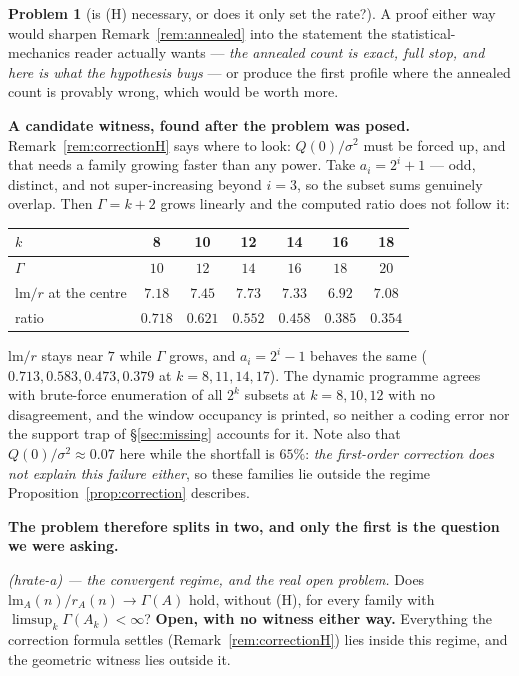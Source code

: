 \documentclass[11pt,a4paper]{article}
\theoremstyle{plain}
\theoremstyle{definition}
\newtheorem{problem}[theorem]{Problem}
\theoremstyle{remark}
\begin{document}
\begin{problem}[is \textup{(H)} necessary, or does it only set the rate?]
A proof either way would sharpen Remark~\ref{rem:annealed} into the statement the
statistical-mechanics reader actually wants --- \emph{the annealed count is exact, full stop,
and here is what the hypothesis buys} --- or produce the first profile where the annealed count
is provably wrong, which would be worth more.

\medskip
\noindent
\textbf{A candidate witness, found after the problem was posed.}
Remark~\ref{rem:correctionH} says where to look: $Q(0)/\sigma^{2}$ must be forced up, and that
needs a family growing faster than any power. Take $a_i=2^{i}+1$ --- odd, distinct, and not
super-increasing beyond $i=3$, so the subset sums genuinely overlap. Then $\Gamma=k+2$ grows
linearly and the computed ratio does not follow it:
\begin{center}
\begin{tabular}{lcccccc}
\toprule
$k$ & 8 & 10 & 12 & 14 & 16 & 18\\
\midrule
$\Gamma$ & $10$ & $12$ & $14$ & $16$ & $18$ & $20$\\
$\mathrm{lm}/r$ at the centre & $7.18$ & $7.45$ & $7.73$ & $7.33$ & $6.92$ & $7.08$\\
ratio & $0.718$ & $0.621$ & $0.552$ & $0.458$ & $0.385$ & $\mathbf{0.354}$\\
\bottomrule
\end{tabular}
\end{center}
\noindent
$\mathrm{lm}/r$ stays near $7$ while $\Gamma$ grows, and $a_i=2^{i}-1$ behaves the same
($0.713,0.583,0.473,0.379$ at $k=8,11,14,17$). The dynamic programme agrees with brute-force
enumeration of all $2^{k}$ subsets at $k=8,10,12$ with no disagreement, and the window occupancy
is printed, so neither a coding error nor the support trap of \S\ref{sec:missing} accounts for
it. Note also that $Q(0)/\sigma^{2}\approx0.07$ here while the shortfall is $65\%$: \emph{the
first-order correction does not explain this failure either}, so these families lie outside the
regime Proposition~\ref{prop:correction} describes.

\noindent
\textbf{The problem therefore splits in two, and only the first is the question we were asking.}

\emph{\textup{(hrate-a)} --- the convergent regime, and the real open problem.} Does
$\mathrm{lm}_A(n)/r_A(n)\to\Gamma(A)$ hold, without \textup{(H)}, for every family with
$\limsup_k\Gamma(A_k)<\infty$? \textbf{Open, with no witness either way.} Everything the
correction formula settles (Remark~\ref{rem:correctionH}) lies inside this regime, and the
geometric witness lies outside it.


\end{problem}
\end{document}
